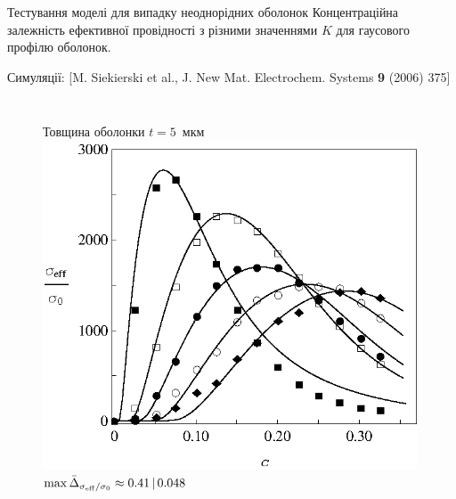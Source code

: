 \documentclass[10pt]{beamer}
\begin{document}
\begin{frame}{Тестування моделі для випадку неоднорідних оболонок}
Концентраційна залежність ефективної провідності з різними значеннями $K$ для гаусового профілю оболонок.
\vspace{-5pt}

\scriptsize{Симуляції: [M. Siekierski et al., J. New Mat. Electrochem. Systems {\bf 9} (2006) 375]}

\footnotesize
\begin{columns}[T,onlytextwidth]
      \begin{figure}
        \centering
        { \qquad Товщина оболонки $t=5$~мкм}
        \includegraphics[width=0.99\textwidth]{images/Fig10_Siekierski_t_fixed.eps}
        $\max \bar{\Delta}_{\sigma_{\rm eff}/\sigma_0} \approx 0.41\,|\,0.048$\\
      \end{figure}


\end{columns}
\end{frame}
\end{document}
